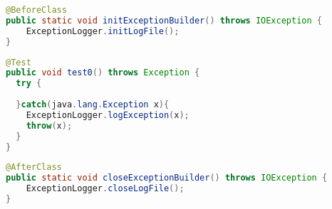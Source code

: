 \begin{lstlisting}[language=java]
@BeforeClass
public static void initExceptionBuilder() throws IOException {
    ExceptionLogger.initLogFile();
}
\end{lstlisting}

\begin{lstlisting}[language=java]
@Test
public void test0() throws Exception {
  try {
  			
  }catch(java.lang.Exception x){
    ExceptionLogger.logException(x);
    throw(x);
  }
}
\end{lstlisting}

\begin{lstlisting}[language=java]
@AfterClass
public static void closeExceptionBuilder() throws IOException {
    ExceptionLogger.closeLogFile();
}
\end{lstlisting}

